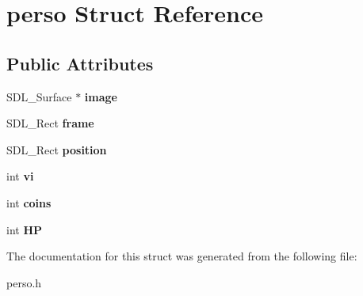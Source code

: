 \hypertarget{structperso}{}\section{perso Struct Reference}
\label{structperso}
\subsection*{Public Attributes}
\begin{DoxyCompactItemize}
\item 
S\+D\+L\+\_\+\+Surface $\ast$ {\bfseries image}\hypertarget{structperso_a3bb43b8e820b3ba348b6c96458b39231}{}\label{structperso_a3bb43b8e820b3ba348b6c96458b39231}

\item 
S\+D\+L\+\_\+\+Rect {\bfseries frame}\hypertarget{structperso_a1131a2be46ede188e4a1b1deaa571ac3}{}\label{structperso_a1131a2be46ede188e4a1b1deaa571ac3}

\item 
S\+D\+L\+\_\+\+Rect {\bfseries position}\hypertarget{structperso_a74aed265eb926987cf218b19d163c746}{}\label{structperso_a74aed265eb926987cf218b19d163c746}

\item 
int {\bfseries vi}\hypertarget{structperso_a115e2208c9a6a45d36b951d04fb2fb1f}{}\label{structperso_a115e2208c9a6a45d36b951d04fb2fb1f}

\item 
int {\bfseries coins}\hypertarget{structperso_a06566a4a0b1f89c646a9aafa6cee700d}{}\label{structperso_a06566a4a0b1f89c646a9aafa6cee700d}

\item 
int {\bfseries HP}\hypertarget{structperso_ae47b9a8af2af325d2442024a7135d4db}{}\label{structperso_ae47b9a8af2af325d2442024a7135d4db}

\end{DoxyCompactItemize}


The documentation for this struct was generated from the following file\+:\begin{DoxyCompactItemize}
\item 
perso.\+h\end{DoxyCompactItemize}

